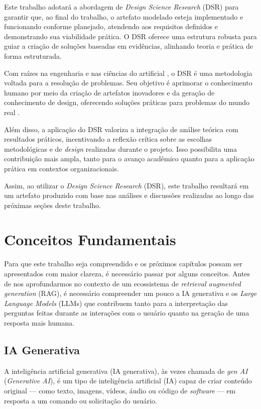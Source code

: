 \documentclass[a4paper, 12pt]{article}
\newcommand{\citeb}[1]{\bibleftbracket\cite{#1}\bibrightbracket}
\begin{document}
    Este trabalho adotará a abordagem de \textit{Design Science Research} (DSR) para garantir que, ao final do trabalho, o artefato modelado esteja implementado e funcionando conforme planejado, atendendo aos requisitos definidos e demonstrando sua viabilidade prática. O DSR oferece uma estrutura robusta para guiar a criação de soluções baseadas em evidências, alinhando teoria e prática de forma estruturada.

    Com raízes na engenharia e nas ciências do artificial \citeb{simon_1996}, o DSR é uma metodologia voltada para a resolução de problemas. Seu objetivo é aprimorar o conhecimento humano por meio da criação de artefatos inovadores e da geração de conhecimento de design, oferecendo soluções práticas para problemas do mundo real \citeb{design_science}.

    Além disso, a aplicação do DSR valoriza a integração de análise teórica com resultados práticos, incentivando a reflexão crítica sobre as escolhas metodológicas e de \textit{design} realizadas durante o projeto. Isso possibilita uma contribuição mais ampla, tanto para o avanço acadêmico quanto para a aplicação prática em contextos organizacionais.
    
    Assim, ao utilizar o \textit{Design Science Research} (DSR), este trabalho resultará em um artefato produzido com base nas análises e discussões realizadas ao longo das próximas seções deste trabalho.
    
    \clearpage

    \section{Conceitos Fundamentais} \label{sec:concepts}

    Para que este trabalho seja compreendido e os próximos capítulos possam ser apresentados com maior clareza, é necessário passar por alguns conceitos. Antes de nos aprofundarmos no contexto de um ecossistema de \textit{retrieval augmented generation} (RAG), é necessário compreender um pouco a IA generativa e os \textit{Large Language Models} (LLMs) que contribuem tanto para a interpretação das perguntas feitas durante as interações com o usuário quanto na geração de uma resposta mais humana.

    \subsection{IA Generativa}
    
    A inteligência artificial generativa (IA generativa), às vezes chamada de \textit{gen AI} (\textit{Generative AI}), é um tipo de inteligência artificial (IA) capaz de criar conteúdo original — como texto, imagens, vídeos, áudio ou código de \textit{software} — em resposta a um comando ou solicitação do usuário. \citeb{genai_ibm}
\end{document}
